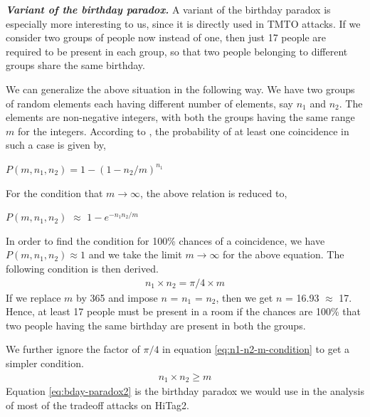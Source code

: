 \noindent \textit{\textbf{Variant of the birthday paradox.}} A variant of the birthday paradox \cite{GeneralizedAttack} is especially more interesting to us, since it is directly used in TMTO attacks. If we consider two groups of people now instead of one, then just 17 people are required to be present in each group, so that two people belonging to different groups share the same birthday.  

We can generalize the above situation in the following way. We have two groups of random elements each having different number of elements, say $n_1$ and $n_2$. The elements are non-negative integers, with both the groups having the same range $m$ for the integers. According to \cite{menezes}, the probability of at least one coincidence in such a case is given by,
\begin{center}
$P(m, n_1, n_2) = 1 -(1 - n_2/m)^{n_1}$
\end{center}
For the condition that $m \rightarrow \infty$, the above relation is reduced to,
\begin{center}
$P(m, n_1, n_2)$ $\approx$ $1 - e^{-{n_{1} n_{2}}/{m}}$
\end{center}
In order to find the condition for 100\% chances of a coincidence, we have $P(m, n_1, n_2) \approx 1$ and we take the limit $m \rightarrow \infty$ for the above equation. The following condition is then derived.
\begin{align}
\label{eq:n1-n2-m-condition} n_1 \times n_2 = \pi/4 \times m
\end{align}
If we replace $m$ by 365 and impose $n$ = $n_1$ = $n_2$, then we get $n$ = 16.93 $\approx$ 17. Hence, at least 17 people must be present in a room if the chances are 100\% that two people having the same birthday are present in both the groups. 

We further ignore the factor of $\pi/4$ in equation \ref{eq:n1-n2-m-condition} to get a simpler condition.  
\begin{align}
\label{eq:bday-paradox2} n_1 \times n_2 \geq m
\end{align}
Equation \ref{eq:bday-paradox2} is the birthday paradox we would use in the analysis of most of the tradeoff attacks on HiTag2.




